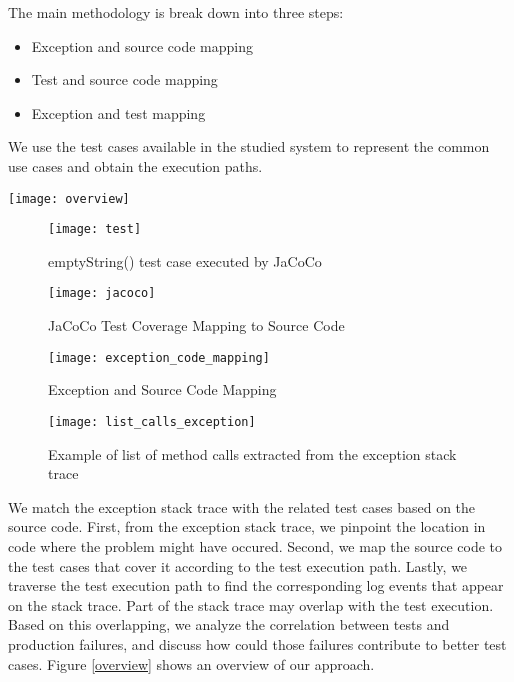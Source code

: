 		The main methodology is break down into three steps:
		\vspace{-0.1cm}
		\begin{itemize} \itemsep 0em
		 \item Exception and source code mapping
		 \item Test and source code mapping
		 \item Exception and test mapping
		\end{itemize}
		
		We use the test cases available in the studied system to represent the common use cases and obtain the execution paths. 
		
		\begin{figure*}[h]
			\texttt{[image: overview]}
			\caption{Overview of the approach on test and exception mapping}
			\label{overview}
		\end{figure*}

		\begin{figure}[h]
			\texttt{[image: test]}
			\caption{emptyString() test case executed by JaCoCo}
			\label{test}
		\end{figure}

		\begin{figure}[h]
			\texttt{[image: jacoco]}
			\caption{JaCoCo Test Coverage Mapping to Source Code}
			\label{jacoco}
		\end{figure}

		\begin{figure}[h]
			\texttt{[image: exception\_code\_mapping]}
			\caption{Exception and Source Code Mapping}
			\label{exception_code_mapping}
		\end{figure}

		\begin{figure}[h]
			\texttt{[image: list\_calls\_exception]}
			\caption{Example of list of method calls extracted from the exception stack trace}
			\label{list_calls_exception}
		\end{figure}

		 We match the exception stack trace with the related test cases based on the source code. First, from the exception stack trace, we pinpoint the location in code where the problem might have occured. Second, we map the source code to the test cases that cover it according to the test execution path. Lastly, we traverse the test execution path to find the corresponding log events that appear on the stack trace. Part of the stack trace may overlap with the test execution. Based on this overlapping, we analyze the correlation between tests and production failures, and discuss how could those failures contribute to better test cases. Figure \ref{overview} shows an overview of our approach.

